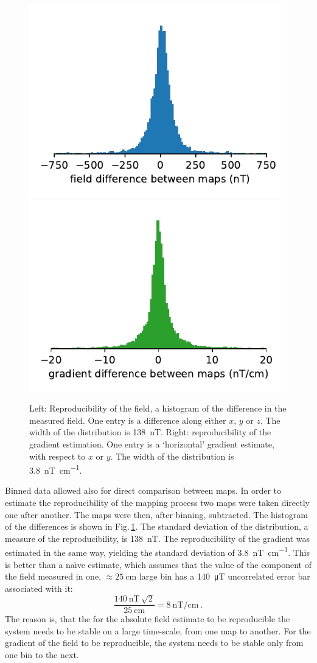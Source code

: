 \begin{figure}
  \centering
  \includegraphics[width=0.49\linewidth]{gfx/mapping/lpsc/reproducibility_field.pdf}
  \includegraphics[width=0.49\linewidth]{gfx/mapping/lpsc/reproducibility_gradient.pdf}
  \caption{Left: Reproducibility of the field, a histogram of the difference in the measured field. One entry is a difference along either $x$, $y$ or $z$. The width of the distribution is \SI{138}{\nano\tesla}. Right: reproducibility of the gradient estimation. One entry is a `horizontal' gradient estimate, with respect to $x$ or $y$. The width of the distribution is \SI[per-mode=symbol]{3.8}{\nano\tesla\per\centi\metre}.}\label{fig:mapping_bastille_reproducibility}
\end{figure}

Binned data allowed also for direct comparison between maps. In order to estimate the reproducibility of the mapping process two maps were taken directly one after another. The maps were then, after binning, subtracted. The histogram of the differences is shown in Fig.\,\ref{fig:mapping_bastille_reproducibility}. The standard deviation of the distribution, a measure of the reproducibility, is \SI{138}{\nano\tesla}. The reproducibility of the gradient was estimated in the same way, yielding the standard deviation of \SI[per-mode=symbol]{3.8}{\nano\tesla\per\centi\metre}. This is better than a na\"{\i}ve estimate, which assumes that the value of the component of the field measured in one, $\approx \SI{25}{\centi\metre}$ large bin has a \SI{140}{\micro\tesla} uncorrelated error bar associated with it:
\begin{equation}
  \frac{\SI{140}{\nano\tesla} \, \sqrt{2}}{\SI{25}{\centi\meter}} = \SI[per-mode=symbol]{8}{\nano\tesla\per\centi\meter} \ .
\end{equation}
The reason is, that the for the absolute field estimate to be reproducible the system needs to be stable on a large time-scale, from one map to another. For the gradient of the field to be reproducible, the system needs to be stable only from one bin to the next.

